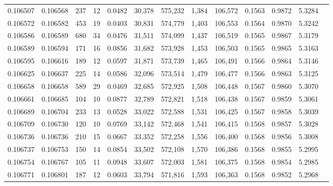 \begin{tabular}{rrrrrrrrrrrrr}
0.106507 & 0.106568 &   237 &  12 &                                     0.0482 &  30,378 & 575,232 &   1,384 & 106,572 & 0.1563 & 0.9872 & 5.3284 \\
0.106572 & 0.106582 &   453 &  19 &                                     0.0403 &  30,831 & 574,779 &   1,403 & 106,553 & 0.1564 & 0.9870 & 5.3242 \\
0.106586 & 0.106589 &   680 &  34 &                                     0.0476 &  31,511 & 574,099 &   1,437 & 106,519 & 0.1565 & 0.9867 & 5.3179 \\
0.106589 & 0.106594 &   171 &  16 &                                     0.0856 &  31,682 & 573,928 &   1,453 & 106,503 & 0.1565 & 0.9865 & 5.3163 \\
0.106595 & 0.106616 &   189 &  12 &                                     0.0597 &  31,871 & 573,739 &   1,465 & 106,491 & 0.1566 & 0.9864 & 5.3146 \\
0.106625 & 0.106637 &   225 &  14 &                                     0.0586 &  32,096 & 573,514 &   1,479 & 106,477 & 0.1566 & 0.9863 & 5.3125 \\
0.106658 & 0.106658 &   589 &  29 &                                     0.0469 &  32,685 & 572,925 &   1,508 & 106,448 & 0.1567 & 0.9860 & 5.3070 \\
0.106661 & 0.106685 &   104 &  10 &                                     0.0877 &  32,789 & 572,821 &   1,518 & 106,438 & 0.1567 & 0.9859 & 5.3061 \\
0.106689 & 0.106704 &   233 &  13 &                                     0.0528 &  33,022 & 572,588 &   1,531 & 106,425 & 0.1567 & 0.9858 & 5.3039 \\
0.106709 & 0.106730 &   120 &  10 &                                     0.0769 &  33,142 & 572,468 &   1,541 & 106,415 & 0.1568 & 0.9857 & 5.3028 \\
0.106736 & 0.106736 &   210 &  15 &                                     0.0667 &  33,352 & 572,258 &   1,556 & 106,400 & 0.1568 & 0.9856 & 5.3008 \\
0.106737 & 0.106753 &   150 &  14 &                                     0.0854 &  33,502 & 572,108 &   1,570 & 106,386 & 0.1568 & 0.9855 & 5.2995 \\
0.106754 & 0.106767 &   105 &  11 &                                     0.0948 &  33,607 & 572,003 &   1,581 & 106,375 & 0.1568 & 0.9854 & 5.2985 \\
0.106771 & 0.106801 &   187 &  12 &                                     0.0603 &  33,794 & 571,816 &   1,593 & 106,363 & 0.1568 & 0.9852 & 5.2968 \\

\end{tabular}
